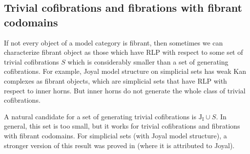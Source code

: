 \documentclass{tac}
\theoremstyle{definition}
\newcommand{\I}{\mathrm{I}}
\newcommand{\J}{\mathrm{J}}
\begin{document}
\subsection{Trivial cofibrations and fibrations with fibrant codomains}

If not every object of a model category is fibrant, then sometimes we can characterize fibrant object as those which have
RLP with respect to some set of trivial cofibrations $S$ which is considerably smaller than a set of generating cofibrations.
For example, Joyal model structure on simplicial sets has weak Kan complexes as fibrant objects,
which are simplicial sets that have RLP with respect to inner horns.
But inner horns do not generate the whole class of trivial cofibrations.

A natural candidate for a set of generating trivial cofibrations is $\J_\I \cup S$.
In general, this set is too small, but it works for trivial cofibrations and fibrations with fibrant codomains.
For simplicial sets (with Joyal model structure), a stronger version of this result was proved in \cite{lurie-topos} (where it is attributed to Joyal).
\end{document}
